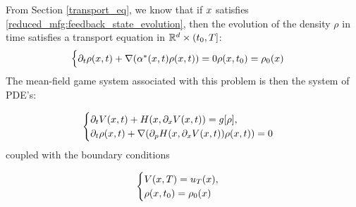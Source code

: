 \documentclass{article}
\begin{document}
From Section
\eqref{transport_eq},
we know that if $x$ satisfies
\eqref{reduced_mfg:feedback_state_evolution},
then the evolution of the density $\rho$ in time satisfies a transport equation in $\mathbb{R}^d \times (t_0, T]$:
\begin{equation}\label{reduced_mfg:density_transport_pde}
    \begin{cases}
        \partial_t \rho(x,t) + \nabla(\alpha^*(x,t) \rho(x,t)) = 0
        \rho(x,t_0) = \rho_0(x)
\end{cases}
\end{equation}
The mean-field game system associated with this problem is then the system of PDE's:

\begin{equation}\label{reduced_mfg:mfg_system}
    \begin{cases}
        \partial_t V (x,t) + H(x,\partial_x V(x,t)) = g[\rho], \\
        \partial_t \rho(x,t) + \nabla(\partial_p H(x, \partial_x V (x,t)) \rho(x,t)) = 0
\end{cases}
\end{equation}
coupled with the boundary conditions

\begin{equation}\label{reduced_mfg:mfg_boundary_conditions}
\begin{cases}
    V(x,T) = u_T(x), \\
    \rho(x,t_0) = \rho_0(x)
\end{cases}
\end{equation}
\end{document}
